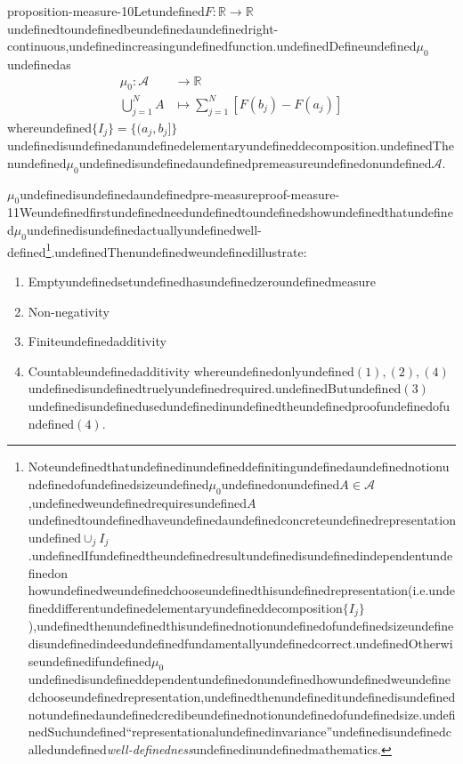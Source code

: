\begin{mystthmproposition}{}{proposition-measure-10}Letundefined$F:\mathbb{R}\to\mathbb{R}$undefinedtoundefinedbeundefinedaundefinedright-continuous,undefinedincreasingundefinedfunction.undefinedDefineundefined$\mu_0$undefinedas
\begin{equation}
\begin{aligned}
\mu_0 : \mathcal A &\to \mathbb{R} \\
\bigcup_{j=1}^N A &\mapsto \sum_{j=1}^N [F(b_j)-F(a_j)]
\end{aligned}
\end{equation}
whereundefined$\{I_j\}=\{(a_j,b_j]\}$undefinedisundefinedanundefinedelementaryundefineddecomposition.undefinedThenundefined$\mu_0$undefinedisundefinedaundefinedpremeasureundefinedonundefined$\mathcal A$.

\end{mystthmproposition}
\begin{mystthmproof}{$\mu_0$undefinedisundefinedaundefinedpre-measure}{proof-measure-11}Weundefinedfirstundefinedneedundefinedtoundefinedshowundefinedthatundefined$\mu_0$undefinedisundefinedactuallyundefinedwell-defined\footnote{Noteundefinedthatundefinedinundefineddefinitingundefinedaundefinednotionundefinedofundefinedsizeundefined$\mu_0$undefinedonundefined$A\in \mathcal A$,undefinedweundefinedrequiresundefined$A$undefinedtoundefinedhaveundefinedaundefinedconcreteundefinedrepresentationundefined$\cup_j I_j$.undefinedIfundefinedtheundefinedresultundefinedisundefinedindependentundefinedon
howundefinedweundefinedchooseundefinedthisundefinedrepresentation(i.e.undefineddifferentundefinedelementaryundefineddecomposition$\{I_j\}$),undefinedthenundefinedthisundefinednotionundefinedofundefinedsizeundefinedisundefinedindeedundefinedfundamentallyundefinedcorrect.undefinedOtherwiseundefinedifundefined$\mu_0$undefinedisundefineddependentundefinedonundefinedhowundefinedweundefinedchooseundefinedrepresentation,undefinedthenundefineditundefinedisundefinednotundefinedaundefinedcredibeundefinednotionundefinedofundefinedsize.undefinedSuchundefined``representationalundefinedinvariance''undefinedisundefinedcalledundefined\textit{well-definedness}undefinedinundefinedmathematics.}.undefinedThenundefinedweundefinedillustrate:

\begin{enumerate}
\item Emptyundefinedsetundefinedhasundefinedzeroundefinedmeasure
\item Non-negativity
\item Finiteundefinedadditivity
\item Countableundefinedadditivity
whereundefinedonlyundefined$(1),(2),(4)$undefinedisundefinedtruelyundefinedrequired.undefinedButundefined$(3)$undefinedisundefinedusedundefinedinundefinedtheundefinedproofundefinedofundefined$(4)$.
\end{enumerate}

\end{mystthmproof}